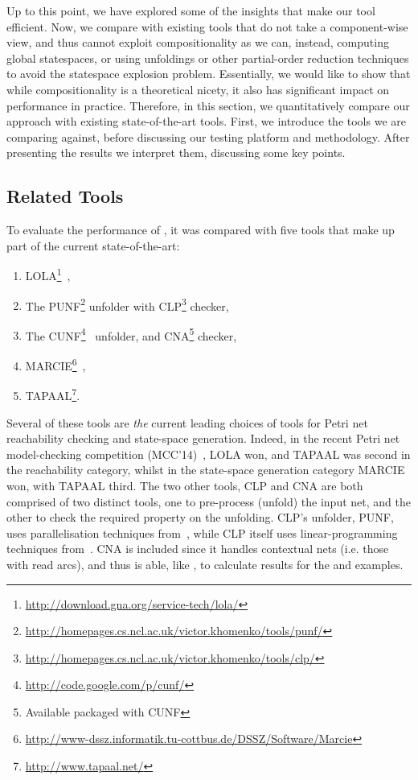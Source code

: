 Up to this point, we have explored some of the insights that make our tool
efficient. Now, we compare with existing tools that do not take a
component-wise view, and thus cannot exploit compositionality as we can,
instead, computing global statespaces, or using unfoldings or other
partial-order reduction techniques to avoid the statespace explosion problem.
Essentially, we would like to show that while compositionality is a theoretical
nicety, it also has significant impact on performance in practice.  Therefore,
in this section, we quantitatively compare our approach with existing
state-of-the-art tools. First, we introduce the tools we are comparing against,
before discussing our testing platform and methodology. After presenting the
results we interpret them, discussing some key points.

\subsection{Related Tools}

\newcommand{\footnoteUrl}[1]{\footnote{\url{#1}}}

To evaluate the performance of \penrose{}, it was compared with five tools that
make up part of the current state-of-the-art:
\begin{enumerate}
    \def\urlLOLA{\footnoteUrl{http://download.gna.org/service-tech/lola/}}
    \def\urlPUNF{\footnoteUrl{http://homepages.cs.ncl.ac.uk/victor.khomenko/tools/punf/}}
    \def\urlCLP{\footnoteUrl{http://homepages.cs.ncl.ac.uk/victor.khomenko/tools/clp/}}
    \def\urlCUNF{\label{fn:CUNF}\footnoteUrl{http://code.google.com/p/cunf/}}
    \def\urlCNA{\footnote{Available packaged with CUNF}}
    \def\urlMARCIE{\footnoteUrl{http://www-dssz.informatik.tu-cottbus.de/DSSZ/Software/Marcie}}
    \def\urlTAPAAL{\footnoteUrl{http://www.tapaal.net/}}
    \item LOLA\urlLOLA~\cite{Schmidt2000b},
    \item The PUNF\urlPUNF{} unfolder with CLP\urlCLP{} checker,
    \item The CUNF\urlCUNF~\cite{Rodriguez2013a} unfolder, and CNA\urlCNA
        checker,
    \item MARCIE\urlMARCIE~\cite{Heiner2013},
    \item TAPAAL\urlTAPAAL.
\end{enumerate}

Several of these tools are \emph{the} current leading choices of tools for
Petri net reachability checking and state-space generation. Indeed, in the
recent Petri net model-checking competition (MCC'14)~\cite{MCC2014}, LOLA won,
and TAPAAL was second in the reachability category, whilst in the state-space
generation category MARCIE won, with TAPAAL third. The two other tools, CLP and
CNA are both comprised of two distinct tools, one to pre-process (unfold) the
input net, and the other to check the required property on the unfolding. CLP's
unfolder, PUNF, uses parallelisation techniques from~\cite{Heljanko2002}, while
CLP itself uses linear-programming techniques from~\cite{Koutny2000}. CNA is
included since it handles contextual nets (i.e. those with read arcs), and thus
is able, like \penrose{}, to calculate results for the \overtakeSys{-} and
\counterSys{-} examples.

